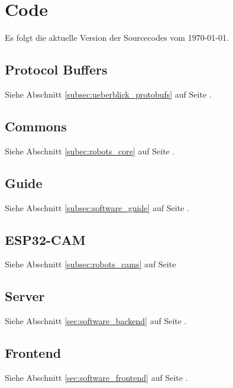 \ExplSyntaxOff

\chapter{Code}
Es folgt die aktuelle Version der Sourcecodes vom \today.

\section{Protocol Buffers}
Siehe Abschnitt \ref{subsec:ueberblick_protobufs} auf Seite \pageref{subsec:ueberblick_protobufs}.
\newline
{}

\section{Commons}
Siehe Abschnitt \ref{subec:robots_core} auf Seite \pageref{subec:robots_core}.
\newline
{}

\section{Guide}
Siehe Abschnitt \ref{subsec:software_guide} auf Seite \pageref{subsec:software_guide}.
\newline
{}


\section{ESP32-CAM}
Siehe Abschnitt \ref{subsec:robots_cams} auf Seite \pageref{subsec:robots_cams}
\newline
{}

\section{Server}
Siehe Abschnitt \ref{sec:software_backend} auf Seite \pageref{sec:software_backend}.
\newline
{}

\section{Frontend}
Siehe Abschnitt \ref{sec:software_frontend} auf Seite \pageref{sec:software_frontend}.
\newline
{}

